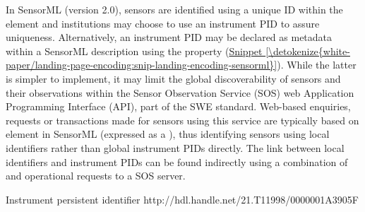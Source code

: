 \documentclass[a4paper,10pt,english]{sphinxmanual}
\begin{document}
In SensorML (version 2.0), sensors are identified using a unique ID
within the  element and institutions may choose to use
an instrument PID to assure uniqueness. Alternatively, an instrument PID
may be declared as metadata within a SensorML description using the
 property (\hyperref[\detokenize{white-paper/landing-page-encoding:snip-landing-encoding-sensorml}]{Snippet \ref{\detokenize{white-paper/landing-page-encoding:snip-landing-encoding-sensorml}}}).
While the latter is simpler to implement, it may limit the global
discoverability of sensors and their observations within the Sensor
Observation Service (SOS) web Application Programming Interface (API),
part of the SWE standard. Web-based enquiries, requests or
transactions made for sensors using this service are typically based
on  element in SensorML (expressed as a ),
thus identifying sensors using local identifiers rather than global
instrument PIDs directly. The link between local identifiers and
instrument PIDs can be found indirectly using a combination of
 and  operational requests to a SOS
server.
\def\sphinxLiteralBlockLabel{\label{\detokenize{white-paper/landing-page-encoding:id6}}\label{\detokenize{white-paper/landing-page-encoding:snip-landing-encoding-sensorml}}}
\begin{sphinxVerbatim}[commandchars=\\\{\}]
     
       Instrument persistent identifier
       http://hdl.handle.net/21.T11998/0000\PYGZhy{}001A\PYGZhy{}3905\PYGZhy{}F
\end{sphinxVerbatim}
\end{document}
